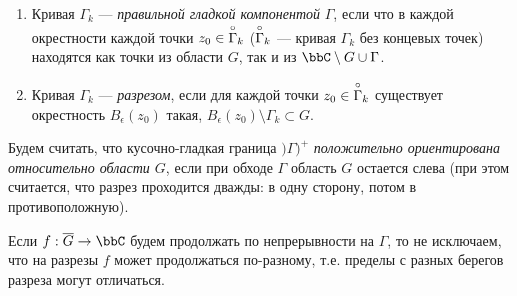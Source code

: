 \begin{enumerate}
\item
Кривая $\Gamma_k$ --- \textit{правильной гладкой компонентой} $\Gamma$, если что в каждой окрестности каждой точки $z_0 \in \;\buildrel\circ\over\Gamma_k$ ($\buildrel\circ\over\Gamma_k$ --- кривая $\Gamma_k$ без концевых точек) находятся как точки из области $G$, так и из $\bbC \setminus G\cup\Gamma$. 

\item
Кривая $\Gamma_k$ --- \textit{разрезом}, если  для каждой точки $z_0 \in\; \buildrel\circ\over\Gamma_k$ существует окрестность $B_\epsilon(z_0)$ такая, $B_\epsilon(z_0)\setminus\Gamma_k \subset G$.
\end{enumerate}
\begin{defn} Будем считать, что кусочно-гладкая граница $)\Gamma)^{+}$ \textit{положительно ориентирована относительно области $G$}, если при обходе $\Gamma$ область $G$ остается слева (при этом считается, что разрез проходится дважды: в одну сторону, потом в противоположную).
\end{defn}

Если $f:\overline{G}\to\bbC$ будем продолжать по непрерывности на $\Gamma$, то не исключаем, что на разрезы $f$ может продолжаться по-разному, т.е. пределы с разных берегов разреза могут отличаться. 

